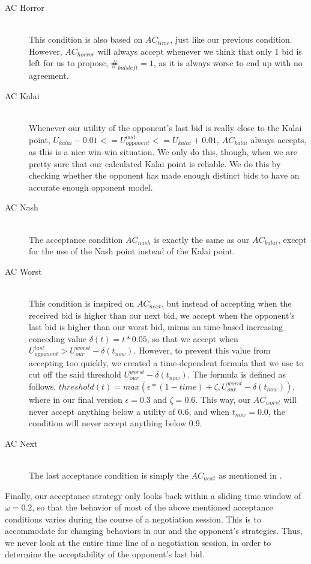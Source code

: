 \begin{description}
  \item[AC Horror] \hfill \\
This condition is also based on $AC_{time}$, just like our previous condition. However, $AC_{horror}$ will always accept whenever we think that only 1 bid is left for us to propose, $\#_{bids left} = 1$, as it is always worse to end up with no agreement.

  \item[AC Kalai] \hfill \\
Whenever our utility of the opponent's last bid is really close to the Kalai point, $U_{kalai} - 0.01 <= U_{opponent}^{last} <= U_{kalai} + 0.01$, $AC_{kalai}$ always accepts, as this is a nice win-win situation. We only do this, though, when we are pretty sure that our calculated Kalai point is reliable. We do this by checking whether the opponent has made enough distinct bids to have an accurate enough opponent model.

  \item[AC Nash] \hfill \\
The acceptance condition $AC_{nash}$ is exactly the same as our $AC_{kalai}$, except for the use of the Nash point instead of the Kalai point.

  \item[AC Worst] \hfill \\
This condition is inspired on $AC_{next}$\cite{baarslag2013acceptance}, but instead of accepting when the received bid is higher than our next bid, we accept when the opponent's last bid is higher than our worst bid, minus an time-based increasing conceding value $\delta(t) = t * 0.05$, so that we accept when $U_{opponent}^{last} > U_{our}^{worst} - \delta(t_{now})$. However, to prevent this value from accepting too quickly, we created a time-dependent formula that we use to cut off the said threshold $U_{our}^{worst} - \delta(t_{now})$. The formula is defined as follows, $threshold(t) = max(\epsilon * (1-time) + \zeta, U_{our}^{worst} - \delta(t_{now}))$, where in our final version $\epsilon = 0.3$ and $\zeta = 0.6$. This way, our $AC_{worst}$ will never accept anything below a utility of 0.6, and when $t_{now} = 0.0$, the condition will never accept anything below 0.9.

  \item[AC Next] \hfill \\
The last acceptance condition is simply the $AC_{next}$ as mentioned in \cite{baarslag2013acceptance}.

\end{description}

Finally, our acceptance strategy only looks back within a sliding time window of $\omega = 0.2$, so that the behavior of most of the above mentioned acceptance conditions varies during the course of a negotiation session. This is to accommodate for changing behaviors in our and the opponent's strategies. Thus, we never look at the entire time line of a negotiation session, in order to determine the acceptability of the opponent's last bid.